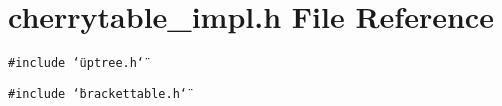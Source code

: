 \section{cherrytable\_\-impl.h File Reference}
\label{cherrytable__impl_8h}
{\tt \#include \char`\"{}uptree.h\char`\"{}}\par
{\tt \#include \char`\"{}brackettable.h\char`\"{}}\par
